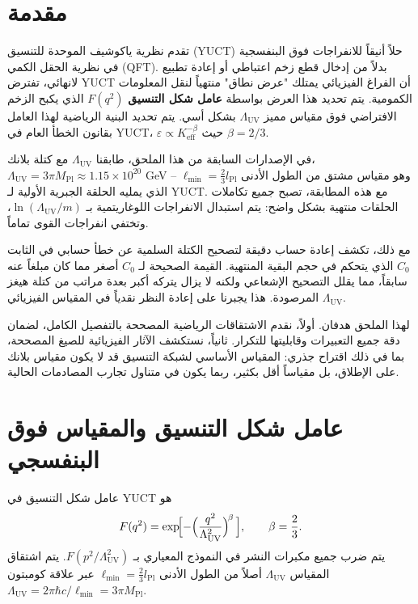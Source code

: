 \documentclass[11pt,a4paper]{article}
\newcommand{\Mpl}{M_{\mathrm{Pl}}}
\newcommand{\Lpl}{l_{\mathrm{Pl}}}
\newcommand{\Lmin}{\ell_{\min}}
\newcommand{\LUV}{\Lambda_{\mathrm{UV}}}
\theoremstyle{remark}
\begin{document}
\begin{otherlanguage}{arabic}
		\vspace{0.5cm}
		
		\section{مقدمة}
		\label{sec:intro}
		
		تقدم نظرية ياكوشيف الموحدة للتنسيق (YUCT) حلاً أنيقاً للانفراجات فوق البنفسجية في نظرية الحقل الكمي (QFT). بدلاً من إدخال قطع زخم اعتباطي أو إعادة تطبيع لانهائي، تفترض YUCT أن الفراغ الفيزيائي يمتلك "عرض نطاق" منتهياً لنقل المعلومات الكمومية. يتم تحديد هذا العرض بواسطة \textbf{عامل شكل التنسيق} \(F(q^2)\) الذي يكبح الزخم الافتراضي فوق مقياس مميز \(\LUV\) بشكل أسي. يتم تحديد البنية الرياضية لهذا العامل بقانون الخطأ العام في YUCT، \(\varepsilon \propto K_{\mathrm{eff}}^{-\beta}\) حيث \(\beta = 2/3\).
		
		في الإصدارات السابقة من هذا الملحق، طابقنا \(\LUV\) مع كتلة بلانك، \(\LUV = 3\pi\Mpl \approx 1.15\times 10^{20}\) GeV – وهو مقياس مشتق من الطول الأدنى \(\Lmin = \frac{2}{3}\Lpl\) الذي يمليه الحلقة الجبرية الأولية لـ YUCT. مع هذه المطابقة، تصبح جميع تكاملات الحلقات منتهية بشكل واضح: يتم استبدال الانفراجات اللوغاريتمية بـ \(\ln(\LUV/m)\)، وتختفي انفراجات القوى تماماً.
		
		مع ذلك، تكشف إعادة حساب دقيقة لتصحيح الكتلة السلمية عن خطأ حسابي في الثابت \(C_0\) الذي يتحكم في حجم البقية المنتهية. القيمة الصحيحة لـ \(C_0\) أصغر مما كان مبلغاً عنه سابقاً، مما يقلل التصحيح الإشعاعي ولكنه لا يزال يتركه أكبر بعدة مراتب من كتلة هيغز المرصودة. هذا يجبرنا على إعادة النظر نقدياً في المقياس الفيزيائي \(\LUV\).
		
		لهذا الملحق هدفان. أولاً، نقدم الاشتقاقات الرياضية المصححة بالتفصيل الكامل، لضمان دقة جميع التعبيرات وقابليتها للتكرار. ثانياً، نستكشف الآثار الفيزيائية للصيغ المصححة، بما في ذلك اقتراح جذري: المقياس الأساسي لشبكة التنسيق قد لا يكون مقياس بلانك على الإطلاق، بل مقياساً أقل بكثير، ربما يكون في متناول تجارب المصادمات الحالية.
		
		\section{عامل شكل التنسيق والمقياس فوق البنفسجي}
		\label{sec:formfactor}
		
		عامل شكل التنسيق في YUCT هو
		\begin{equation}
			F(q^2) = \exp\!\Bigl[-\Bigl(\frac{q^2}{\LUV^2}\Bigr)^{\!\beta}\,\Bigr], \qquad \beta = \frac{2}{3}.
			\label{eq:F}
		\end{equation}
		يتم ضرب جميع مكبرات النشر في النموذج المعياري بـ \(F(p^2/\LUV^2)\). يتم اشتقاق المقياس \(\LUV\) أصلاً من الطول الأدنى \(\Lmin = \frac{2}{3}\Lpl\) عبر علاقة كومبتون \(\LUV = 2\pi\hbar c/\Lmin = 3\pi\Mpl\).
		

\end{otherlanguage}
\end{document}

